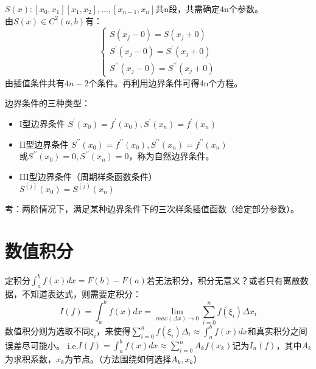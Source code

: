 \documentclass[a4paper]{article}
\begin{document}
$S(x): [x_0, x_1][x_1,x_2],\dots, [x_{n-1},x_n] $共n段，共需确定4n个参数。\\
由$S(x)\in C^2(a,b)$有：
\begin{equation*}
    \left\{
    \begin{array}{lr}
        S(x_j-0) = S(x_j+0) \\
        S^{'}(x_j-0) = S^{'}(x_j+0) \\
        S^{{'}{'}}(x_j-0) = S^{{'}{'}}(x_j+0)
    \end{array}\right.
\end{equation*}
由插值条件共有$4n-2$个条件。再利用边界条件可得4n个方程。

边界条件的三种类型：
\begin{itemize}
    \item I型边界条件 $S^{'}(x_0)=f^{'}(x_0), S^{'}(x_n)=f^{'}(x_n) $
    \item II型边界条件 $S^{{'}{'}}(x_0)=f^{{'}{'}}(x_0), S^{{'}{'}}(x_n)=f^{{'}{'}}(x_n) $\\
        或$S^{{'}{'}}(x_0)=0, S^{{'}{'}}(x_n)=0 $，称为自然边界条件。
    \item III型边界条件（周期样条函数条件）\\
        $S^{(j)}(x_0)=S^{(j)}(x_n) $
\end{itemize}

考：两阶情况下，满足某种边界条件下的三次样条插值函数（给定部分参数）。

\section{数值积分}

定积分$\int^b_a f(x)dx=F(b)-F(a) $若无法积分，积分无意义？或者只有离散数据，不知道表达式，则需要定积分：
\begin{equation}
    I(f) = \int^b_af(x)dx = \lim_{max(\Delta x)\rightarrow 0}\sum^n_{i=0}f(\xi_i)\Delta x_i
\end{equation}
数值积分则为选取不同$\xi_i$，来使得$\sum^n_{i=0}f(\xi_i)\Delta_i \approx \int^b_af(x)dx $和真实积分之间误差尽可能小。
i.e.$I(f)=\int^b_af(x)dx\approx \sum^n_{i=0}A_kf(x_k)$记为$I_n(f)$，其中$A_k$为求积系数，$x_k$为节点。（方法围绕如何选择$A_k, x_k$）
\end{document}
